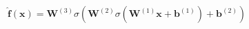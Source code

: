 \documentclass[preview]{standalone}
\begin{document}
\begin{align*}
\hat{\mathbf{f}}(\mathbf{x}) = \mathbf{W}^{(3)}\sigma\left(\mathbf{W}^{(2)} \sigma\left(\mathbf{W}^{(1)} \mathbf{x} + \mathbf{b}^{(1)}\right) + \mathbf{b}^{(2)}\right)
\end{align*}
\end{document}
